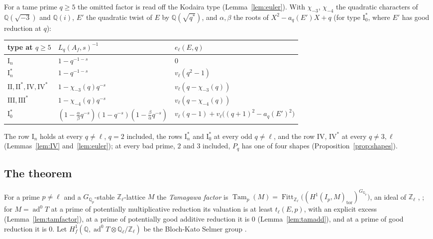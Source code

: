 \documentclass[11pt]{amsart}
\theoremstyle{definition}
\newcommand{\Q}{\mathbb{Q}}
\newcommand{\Z}{\mathbb{Z}}
\newcommand{\ad}{\operatorname{ad}^0}
\newcommand{\Fitt}{\operatorname{Fitt}}
\newcommand{\Tam}{\operatorname{Tam}}
\begin{document}
For a tame prime $q\ge5$ the omitted factor is read off the Kodaira type (Lemma~\ref{lem:euler}). With $\chi_{-3}$, $\chi_{-4}$ the quadratic characters of $\Q(\sqrt{-3})$ and $\Q(i)$, $E'$ the quadratic twist of $E$ by $\Q(\sqrt{q^*})$, and $\alpha,\beta$ the roots of $X^2-a_q(E')X+q$ (for type $\mathrm{I}_0^*$, where $E'$ has good reduction at $q$):
\begin{center}\footnotesize\setlength{\tabcolsep}{4pt}
\begin{tabular}{lll}
\toprule
type at $q\ge5$ & $L_q(A_f,s)^{-1}$ & $e_\ell(E,q)$\\
\midrule
$\mathrm{I}_n$ & $1-q^{-1-s}$ & $0$\\
$\mathrm{I}_n^*$ & $1-q^{-1-s}$ & $v_\ell(q^2-1)$\\
$\mathrm{II},\mathrm{II}^*,\mathrm{IV},\mathrm{IV}^*$ & $1-\chi_{-3}(q)q^{-s}$ & $v_\ell(q-\chi_{-3}(q))$\\
$\mathrm{III},\mathrm{III}^*$ & $1-\chi_{-4}(q)q^{-s}$ & $v_\ell(q-\chi_{-4}(q))$\\
$\mathrm{I}_0^*$ & $(1-\tfrac{\alpha}{\beta}q^{-s})(1-q^{-s})(1-\tfrac{\beta}{\alpha}q^{-s})$ & $v_\ell(q-1)+v_\ell\bigl((q+1)^2-a_q(E')^2\bigr)$\\
\bottomrule
\end{tabular}
\end{center}
The row $\mathrm{I}_n$ holds at every $q\ne\ell$, $q=2$ included, the rows $\mathrm{I}_n^*$ and $\mathrm{I}_0^*$ at every odd $q\ne\ell$, and the row $\mathrm{IV}$, $\mathrm{IV}^*$ at every $q\ne3,\ell$ (Lemmas~\ref{lem:IV} and~\ref{lem:euler}); at every bad prime, $2$ and $3$ included, $P_q$ has one of four shapes (Proposition~\ref{prop:shapes}).

\subsection{The theorem}
For a prime $p\ne\ell$ and a $G_{\Q_p}$-stable $\Z_\ell$-lattice $M$ the \emph{Tamagawa factor} is $\Tam_p(M)=\Fitt_{\Z_\ell}\bigl((H^1(I_p,M)_{\mathrm{tor}})^{G_{\Q_p}}\bigr)$, an ideal of $\Z_\ell$ \cite[p.~708]{DFG04}, \cite[I.4.2.2]{FPR94}; for $M=\ad T$ at a prime of potentially multiplicative reduction its valuation is at least $t_\ell(E,p)$, with an explicit excess (Lemma~\ref{lem:tamfactor}), at a prime of potentially good additive reduction it is $0$ (Lemma~\ref{lem:tamadd}), and at a prime of good reduction it is $0$. Let $H^1_f(\Q,\ad T\otimes\Q_\ell/\Z_\ell)$ be the Bloch-Kato Selmer group \cite[\S2.1]{DFG04}.
\end{document}
